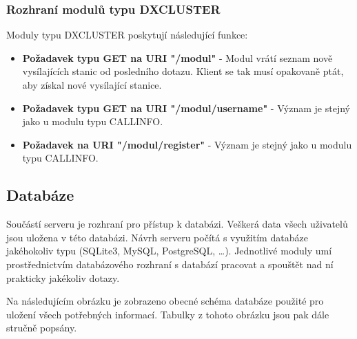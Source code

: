 \subsubsection{Rozhraní modulů typu DXCLUSTER}

Moduly typu DXCLUSTER poskytují následující funkce:

\begin{itemize}
\item \textbf{Požadavek typu GET na URI "/modul"} - Modul vrátí seznam nově vysílajících stanic od posledního dotazu. Klient se tak
musí opakovaně ptát, aby získal nové vysílající stanice.
\item \textbf{Požadavek typu GET na URI "/modul/username"} - Význam je stejný jako u modulu typu CALLINFO.
\item \textbf{Požadavek na URI "/modul/register"} - Význam je stejný jako u modulu typu CALLINFO.
\end{itemize}

\subsection{Databáze}
\label{navrh_databaze}

Součástí serveru je rozhraní pro přístup k databázi. Veškerá data všech
uživatelů jsou uložena v této databázi.
Návrh serveru počítá s využitím databáze jakéhokoliv typu (SQLite3, MySQL, PostgreSQL, \dots). Jednotlivé moduly
umí prostřednictvím databázového rozhraní s databází pracovat a spouštět nad ní prakticky jakékoliv dotazy.

Na následujícím obrázku je zobrazeno obecné schéma databáze použité pro uložení všech potřebných informací. Tabulky
z tohoto obrázku jsou pak dále stručně popsány.

